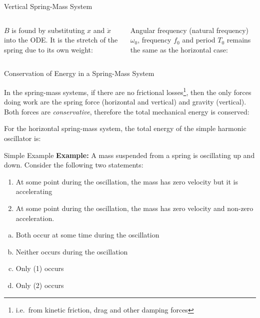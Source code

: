 \documentclass[12pt,compress,aspectratio=169]{beamer}
\begin{document}
\begin{frame}{Vertical Spring-Mass System}
  \begin{columns}
    

    $B$ is found by substituting $x$ and $\ddot x$ into the ODE. It is the
    stretch of the spring due to its own weight:
    

    Angular frequency (natural frequency) $\omega_0$, frequency $f_0$ and
    period $T_0$ remains the same as the horizontal case:

  \end{columns}
\end{frame}



\begin{frame}{Conservation of Energy in a Spring-Mass System}

  In the spring-mass systems, if there are no frictional losses\footnote{i.e.\
  from kinetic friction, drag and other damping forces}, then the only
  forces doing work are the spring force (horizontal and vertical) and gravity
  (vertical). Both forces are \emph{conservative}, therefore the total
  mechanical energy is conserved:

  
  For the horizontal spring-mass system, the total energy of the simple harmonic
  oscillator is:
    
  
  \vspace{.2in}
\end{frame}



\begin{frame}{Simple Example}
  \textbf{Example:} A mass suspended from a spring is oscillating up and
  down. Consider the following two statements:
  \begin{enumerate}
  \item At some point during the oscillation, the mass has zero velocity but it
    is accelerating
  \item At some point during the oscillation, the mass has zero velocity and
    non-zero acceleration.
  \end{enumerate}

  \begin{enumerate}[(a)]
  \item Both occur at some time during the oscillation
  \item Neither occurs during the oscillation
  \item Only (1) occurs
  \item Only (2) occurs
  \end{enumerate}
\end{frame}
\end{document}
